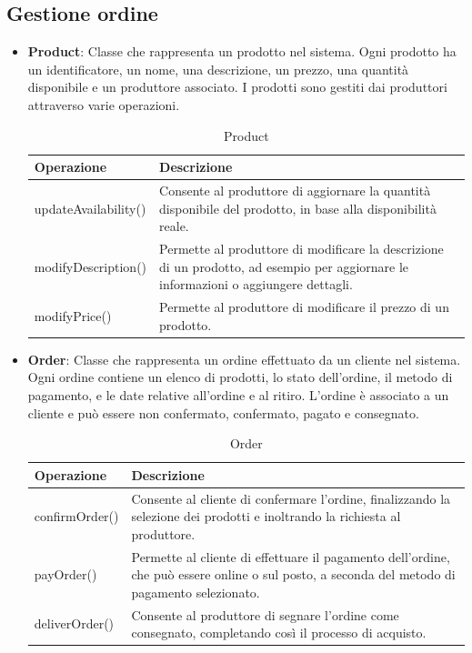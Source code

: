 \subsection{Gestione ordine}
\begin{itemize}
    \item \textbf{Product}:
Classe che rappresenta un prodotto nel sistema. Ogni prodotto ha un identificatore, un nome, una descrizione, un prezzo, una quantità disponibile e un produttore associato. I prodotti sono gestiti dai produttori attraverso varie operazioni.
\begin{table}[!htbp]
    \centering
    \begin{tabularx}{0.9\textwidth}{ >{\centering\arraybackslash}m{4cm} | X  } 
    \hline
         \textbf{Operazione} & \textbf{Descrizione} \\
         \hline
         updateAvailability() & Consente al produttore di aggiornare la quantità disponibile del prodotto, in base alla disponibilità reale. \\
         \hline
         modifyDescription() & Permette al produttore di modificare la descrizione di un prodotto, ad esempio per aggiornare le informazioni o aggiungere dettagli. \\
         \hline
         modifyPrice() & Permette al produttore di modificare il prezzo di un prodotto. \\
         \hline
    \end{tabularx}
    \caption{Product}
\end{table}


\item \textbf{Order}:
Classe che rappresenta un ordine effettuato da un cliente nel sistema. Ogni ordine contiene un elenco di prodotti, lo stato dell'ordine, il metodo di pagamento, e le date relative all'ordine e al ritiro. L'ordine è associato a un cliente e può essere non confermato, confermato, pagato e consegnato.
\begin{table}[!htbp]
    \centering
    \begin{tabularx}{0.9\textwidth}{ >{\centering\arraybackslash}m{4cm} | X  } 
    \hline
         \textbf{Operazione} & \textbf{Descrizione} \\
         \hline
         confirmOrder() & Consente al cliente di confermare l'ordine, finalizzando la selezione dei prodotti e inoltrando la richiesta al produttore. \\
         \hline
         payOrder() & Permette al cliente di effettuare il pagamento dell'ordine, che può essere online o sul posto, a seconda del metodo di pagamento selezionato. \\
         \hline
         deliverOrder() & Consente al produttore di segnare l'ordine come consegnato, completando così il processo di acquisto. \\
         \hline
    \end{tabularx}
    \caption{Order}
\end{table}



\end{itemize}
